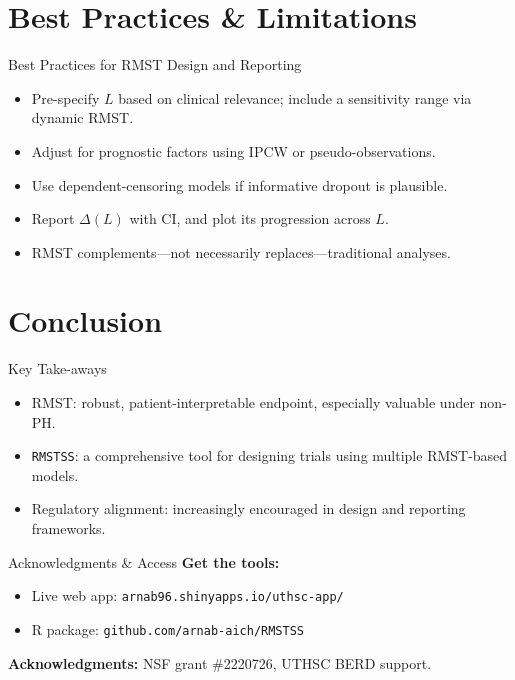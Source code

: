 \documentclass{beamer}
\begin{document}
\section{Best Practices \& Limitations}

\begin{frame}{Best Practices for RMST Design and Reporting}
\begin{itemize}
  \item Pre-specify \(L\) based on clinical relevance; include a sensitivity range via dynamic RMST.
  \item Adjust for prognostic factors using IPCW or pseudo-observations.
  \item Use dependent-censoring models if informative dropout is plausible.
  \item Report \(\Delta(L)\) with CI, and plot its progression across \(L\).
  \item RMST complements—not necessarily replaces—traditional analyses.
\end{itemize}
\end{frame}

\section{Conclusion}

\begin{frame}{Key Take-aways}
\begin{itemize}
  \item RMST: robust, patient-interpretable endpoint, especially valuable under non-PH.
  \item \texttt{RMSTSS}: a comprehensive tool for designing trials using multiple RMST-based models.
  \item Regulatory alignment: increasingly encouraged in design and reporting frameworks.
\end{itemize}
\end{frame}

\begin{frame}{Acknowledgments \& Access}
\textbf{Get the tools:}
\begin{itemize}
  \item Live web app: \texttt{arnab96.shinyapps.io/uthsc-app/}
  \item R package: \texttt{github.com/arnab-aich/RMSTSS}
\end{itemize}
\vspace{0.5em}
\textbf{Acknowledgments:} NSF grant \#2220726, UTHSC BERD support.
\end{frame}
\end{document}
